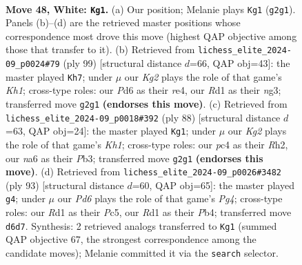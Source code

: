 \documentclass[11pt]{article}
\begin{document}
\clearpage

\begin{figure}[p]\centering
\begin{subfigure}{0.46\textwidth}\centering
\resizebox{\linewidth}{!}{%
\newchessgame
\chessboard[
  setfen={5rk1/p7/np1P4/4Qp1q/P1p5/6P1/1P4K1/R2R4 w - - 2 48},
  showmover=false,
  pgfstyle=straightmove, color=movearrow, markmove={g2-g1}
]}
\caption{}
\end{subfigure}\hfill
\begin{subfigure}{0.46\textwidth}\centering
\resizebox{\linewidth}{!}{%
\newchessgame
\chessboard[
  setfen={7k/p4r2/2Q2p1n/1p4q1/3PR3/6NP/PP3PP1/6K1 b - - 1 50},
  showmover=false,
  pgfstyle=straightmove, color=movearrow, markmove={h8-h7}
]}
\caption{}
\end{subfigure}
\\[4pt]
\begin{subfigure}{0.46\textwidth}\centering
\resizebox{\linewidth}{!}{%
\newchessgame
\chessboard[
  setfen={8/1q1r2k1/5p2/4pbp1/Q7/1P3P2/P6R/5R1K w - - 3 45},
  showmover=false,
  pgfstyle=straightmove, color=movearrow, markmove={h1-g1}
]}
\caption{}
\end{subfigure}\hfill
\begin{subfigure}{0.46\textwidth}\centering
\resizebox{\linewidth}{!}{%
\newchessgame
\chessboard[
  setfen={6k1/4q3/4P3/1Qp3p1/Pp1r3p/7P/6P1/4R2K b - - 2 47},
  showmover=false,
  pgfstyle=straightmove, color=movearrow, markmove={g5-g4}
]}
\caption{}
\end{subfigure}
\caption{\textbf{Move 48, White: \texttt{Kg1}.} (a) Our position; Melanie plays \texttt{Kg1} (\texttt{g2g1}). Panels (b)--(d) are the retrieved master positions whose correspondence most drove this move (highest QAP objective among those that transfer to it). (b) Retrieved from \texttt{lichess\_elite\_2024-09\_p0024\#79} (ply 99) [structural distance $d$=66, QAP obj=43]: the master played \texttt{Kh7}; under $\mu$ our \emph{Kg2} plays the role of that game's \emph{Kh1}; cross-type roles: our \emph{P}d6 as their \emph{r}e4, our \emph{R}d1 as their \emph{n}g3; transferred move \texttt{g2g1} \textbf{(endorses this move)}. (c) Retrieved from \texttt{lichess\_elite\_2024-09\_p0018\#392} (ply 88) [structural distance $d$=63, QAP obj=24]: the master played \texttt{Kg1}; under $\mu$ our \emph{Kg2} plays the role of that game's \emph{Kh1}; cross-type roles: our \emph{p}c4 as their \emph{R}h2, our \emph{n}a6 as their \emph{P}b3; transferred move \texttt{g2g1} \textbf{(endorses this move)}. (d) Retrieved from \texttt{lichess\_elite\_2024-09\_p0026\#3482} (ply 93) [structural distance $d$=60, QAP obj=65]: the master played \texttt{g4}; under $\mu$ our \emph{Pd6} plays the role of that game's \emph{Pg4}; cross-type roles: our \emph{R}d1 as their \emph{P}c5, our \emph{R}d1 as their \emph{P}b4; transferred move \texttt{d6d7}. Synthesis: 2 retrieved analogs transferred to \texttt{Kg1} (summed QAP objective 67, the strongest correspondence among the candidate moves); Melanie committed it via the \texttt{search} selector.}
\label{fig:thought-m94}
\end{figure}
\end{document}
